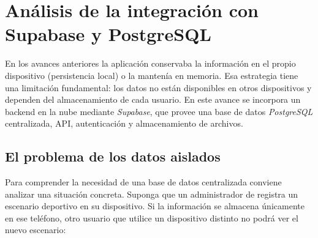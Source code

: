 
\section{An\'alisis de la integraci\'on con Supabase y PostgreSQL}

En los avances anteriores la aplicaci\'on \nombreApp{} conservaba la
informaci\'on en el propio dispositivo (persistencia local) o la manten\'ia
en memoria. Esa estrategia tiene una limitaci\'on fundamental: los datos
no est\'an disponibles en otros dispositivos y dependen del almacenamiento
de cada usuario. En este avance se incorpora un backend en la nube
mediante \textit{Supabase}, que provee una base de datos \textit{PostgreSQL}
centralizada, API, autenticaci\'on y almacenamiento de archivos.

\subsection{El problema de los datos aislados}

Para comprender la necesidad de una base de datos centralizada conviene
analizar una situaci\'on concreta. Suponga que un administrador de
\nombreApp{} registra un escenario deportivo en su dispositivo. Si la
informaci\'on se almacena \'unicamente en ese tel\'efono, otro usuario que
utilice un dispositivo distinto no podr\'a ver el nuevo escenario:

\begin{figure}[H]
\centering
\end{figure}


